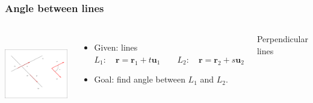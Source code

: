 \begin{frame}
\frametitle{Angle between lines}

\begin{columns}
\includegraphics[height=1.4in]{../../modules/vectors/pictures/ok-angle_line_line.eps}
\begin{itemize}
\item Given: lines $L_1: \quad \textbf{r}= \textbf{r}_1+t\textbf{u}_1 \qquad L_2: \quad \textbf{r}= \textbf{r}_2+s\textbf{u}_2$
\item Goal: find angle between $L_1$ and $L_2$.
\end{itemize}
\alert<1->{Perpendicular} lines
\end{columns}
\end{frame}